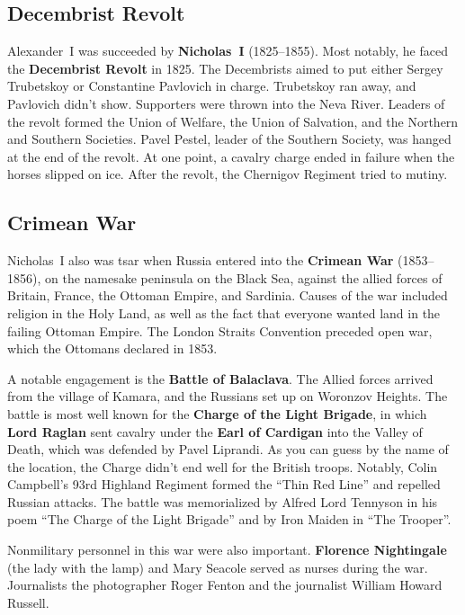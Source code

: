\subsection*{Decembrist Revolt}

Alexander~I was succeeded by \textbf{Nicholas~I} (1825--1855).
Most notably, he faced the \textbf{Decembrist Revolt} in 1825.
The Decembrists aimed to put either Sergey Trubetskoy or Constantine Pavlovich in charge.
Trubetskoy ran away, and Pavlovich didn't show.
Supporters were thrown into the Neva River.
Leaders of the revolt formed the Union of Welfare, the Union of Salvation, and the Northern and Southern Societies.
Pavel Pestel, leader of the Southern Society, was hanged at the end of the revolt.
At one point, a cavalry charge ended in failure when the horses slipped on ice.
After the revolt, the Chernigov Regiment tried to mutiny.

\subsection*{Crimean War}

Nicholas~I also was tsar when Russia entered into the \textbf{Crimean War} (1853--1856),
on the namesake peninsula on the Black Sea,
against the allied forces of Britain, France, the Ottoman Empire, and Sardinia.
Causes of the war included religion in the Holy Land,
as well as the fact that everyone wanted land in the failing Ottoman Empire.
The London Straits Convention preceded open war, which the Ottomans declared in 1853.

A notable engagement is the \textbf{Battle of Balaclava}.
The Allied forces arrived from the village of Kamara, and the Russians set up on Woronzov Heights.
The battle is most well known for the \textbf{Charge of the Light Brigade},
in which \textbf{Lord Raglan} sent cavalry under the \textbf{Earl of Cardigan} into the Valley of Death,
which was defended by Pavel Liprandi.
As you can guess by the name of the location, the Charge didn't end well for the British troops.
Notably, Colin Campbell's 93rd Highland Regiment formed the ``Thin Red Line'' and repelled Russian attacks.
The battle was memorialized by Alfred Lord Tennyson in his poem ``The Charge of the Light Brigade''
and by Iron Maiden in ``The Trooper''.

Nonmilitary personnel in this war were also important.
\textbf{Florence Nightingale} (the lady with the lamp) and Mary Seacole served as nurses during the war.
Journalists the photographer Roger Fenton and the journalist William Howard Russell.

